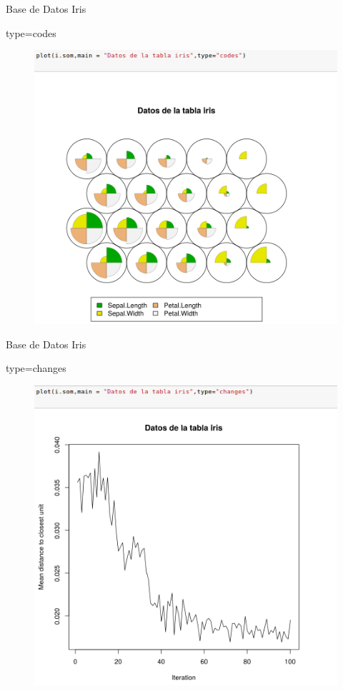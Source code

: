 \documentclass{beamer}
\begin{document}
\begin{frame}{Base de Datos Iris}
\begin{block}{type=codes}
\begin{figure}
\includegraphics[scale=0.4]{codes.png}
\centering
\end{figure}
\end{block}
\end{frame}

\begin{frame}{Base de Datos Iris}
\begin{block}{type=changes}
\begin{figure}
\includegraphics[scale=0.4]{changes.png}
\centering
\end{figure}
\end{block}
\end{frame}
\end{document}
